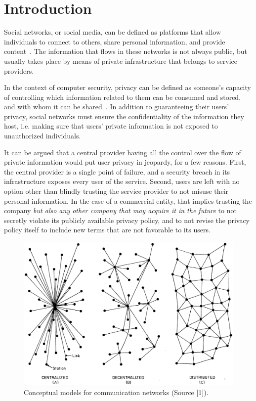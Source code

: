 \chapter{Introduction}
\label{chapter:1}

Social networks, or social media, can be defined as platforms that allow
individuals to connect to others, share personal information, and
provide content~\cite{boyd2007}. The information that flows in these
networks is not always public, but usually takes place by means of
private infrastructure that belongs to service providers.

In the context of computer security, privacy can be defined as someone's
capacity of controlling which information related to them can be consumed and
stored, and with whom it can be shared~\cite{stallings2010}. In addition to
guaranteeing their users' privacy, social networks must ensure the
confidentiality of the information they host, i.e. making sure that users'
private information is not exposed to unauthorized individuals.

It can be argued that a central provider having all the control over the
flow of private information would put user privacy in jeopardy,
for a few reasons. First, the central provider is a single point of
failure, and a security breach in its infrastructure exposes every user
of the service. Second, users are left with no option other than blindly
trusting the service provider to not misuse their personal information.
In the case of a commercial entity, that implies trusting the company
\textit{but also any other company that may acquire it in the future} to
not secretly violate its publicly available privacy policy, and to not
revise the privacy policy itself to include new terms that are not
favorable to its users.

\begin{figure}[!htbp]
	\centering
		\includegraphics[keepaspectratio=true,scale=0.35]{figures/org_redes.eps}
	\caption{Conceptual models for communication networks (Source [1]).}
	\label{fig:org_redes}
\end{figure}

